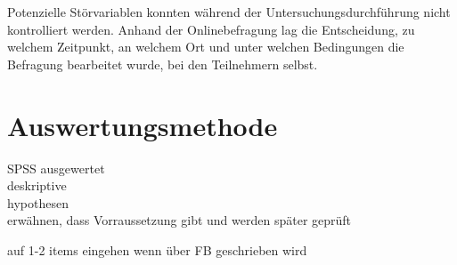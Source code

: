Potenzielle Störvariablen konnten während der Untersuchungsdurchführung nicht kontrolliert werden. Anhand der Onlinebefragung lag die Entscheidung, zu welchem Zeitpunkt, an welchem Ort und unter welchen Bedingungen die Befragung bearbeitet wurde, bei den Teilnehmern selbst.


\section{Auswertungsmethode}    \label{sec_3.5}
SPSS ausgewertet \\ %
deskriptive \\ %
hypothesen \\ %
erwähnen, dass Vorraussetzung gibt und werden später geprüft

auf 1-2 items eingehen wenn über FB geschrieben wird